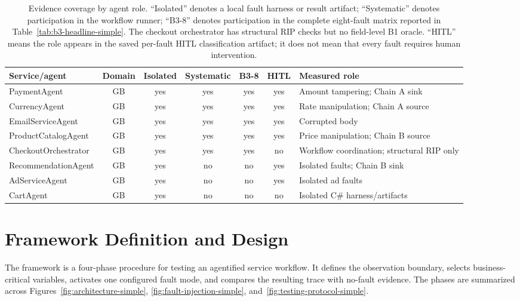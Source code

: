 \documentclass[sigconf,review,anonymous,balance=false]{acmart}
\begin{document}
\begin{table}[t]
\centering
\caption{Evidence coverage by agent role. ``Isolated'' denotes a local fault
harness or result artifact; ``Systematic'' denotes participation in the
workflow runner; ``B3-8'' denotes participation in the complete eight-fault
matrix reported in Table~\ref{tab:b3-headline-simple}. The checkout
orchestrator has structural RIP checks but no field-level B1 oracle. ``HITL''
means the role appears in the saved per-fault HITL classification artifact; it
does not mean that every fault requires human intervention.}
\label{tab:service-coverage-simple}
\footnotesize
\begin{tabularx}{\textwidth}{lcccccY}
\toprule
\textbf{Service/agent} & \textbf{Domain} & \textbf{Isolated} & \textbf{Systematic} & \textbf{B3-8} & \textbf{HITL} & \textbf{Measured role} \\
\midrule
PaymentAgent          & GB & yes & yes & yes & yes & Amount tampering; Chain A sink \\
CurrencyAgent         & GB & yes & yes & yes & yes & Rate manipulation; Chain A source \\
EmailServiceAgent     & GB & yes & yes & yes & yes & Corrupted body \\
ProductCatalogAgent   & GB & yes & yes & yes & yes & Price manipulation; Chain B source \\
CheckoutOrchestrator  & GB & yes & yes & yes & no  & Workflow coordination; structural RIP only \\
RecommendationAgent  & GB & yes & no  & no  & yes & Isolated faults; Chain B sink \\
AdServiceAgent        & GB & yes & no  & no  & yes & Isolated ad faults \\
CartAgent             & GB & yes & no  & no  & no  & Isolated C\# harness/artifacts \\
\bottomrule
\end{tabularx}
\end{table}

\section{Framework Definition and Design}
\label{sec:framework}

The framework is a four-phase procedure for testing an agentified service
workflow. It defines the observation boundary, selects business-critical
variables, activates one configured fault mode, and compares the resulting trace with
no-fault evidence. The phases are summarized across
Figures~\ref{fig:architecture-simple}, \ref{fig:fault-injection-simple},
and~\ref{fig:testing-protocol-simple}.
\end{document}
